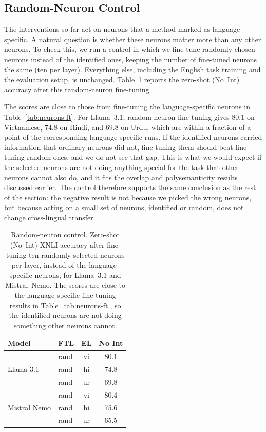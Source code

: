\subsection{Random-Neuron Control}
\label{subsec:neurons-random}

The interventions so far act on neurons that a method marked as language-specific.
A natural question is whether these neurons matter more than any other neurons. To
check this, we run a control in which we fine-tune randomly chosen neurons instead
of the identified ones, keeping the number of fine-tuned neurons the same (ten per
layer). Everything else, including the English task training and the evaluation
setup, is unchanged. Table~\ref{tab:neurons-random} reports the zero-shot
(No~Int) accuracy after this random-neuron fine-tuning.

The scores are close to those from fine-tuning the language-specific neurons in
Table~\ref{tab:neurons-ft}. For Llama~3.1, random-neuron fine-tuning gives $80.1$
on Vietnamese, $74.8$ on Hindi, and $69.8$ on Urdu, which are within a fraction of
a point of the corresponding language-specific runs. If the identified neurons
carried information that ordinary neurons did not, fine-tuning them should beat
fine-tuning random ones, and we do not see that gap. This is what we would expect
if the selected neurons are not doing anything special for the task that other
neurons cannot also do, and it fits the overlap and polysemanticity results
discussed earlier. The control therefore supports the same conclusion as the rest
of the section: the negative result is not because we picked the wrong neurons, but
because acting on a small set of neurons, identified or random, does not change
cross-lingual transfer.

\begin{table}[ht!]
	\centering
	\renewcommand{\arraystretch}{1.3}
	\setlength{\tabcolsep}{8pt}
	\footnotesize
	\begin{tabular}{llcc}
		\toprule
		\textbf{Model} & \textbf{FTL} & \textbf{EL} & \textbf{No Int} \\
		\midrule
		\multirow{3}{*}{Llama 3.1}    & rand & vi & 80.1 \\
		& rand & hi & 74.8 \\
		& rand & ur & 69.8 \\
		\midrule
		\multirow{3}{*}{Mistral Nemo} & rand & vi & 80.4 \\
		& rand & hi & 75.6 \\
		& rand & ur & 65.5 \\
		\bottomrule
	\end{tabular}
	\caption{Random-neuron control. Zero-shot (No~Int) XNLI accuracy after
		fine-tuning ten randomly selected neurons per layer, instead of the
		language-specific neurons, for Llama~3.1 and Mistral~Nemo. The scores are close
		to the language-specific fine-tuning results in
		Table~\ref{tab:neurons-ft}, so the identified neurons are not doing something
		other neurons cannot.}
	\label{tab:neurons-random}
\end{table}

